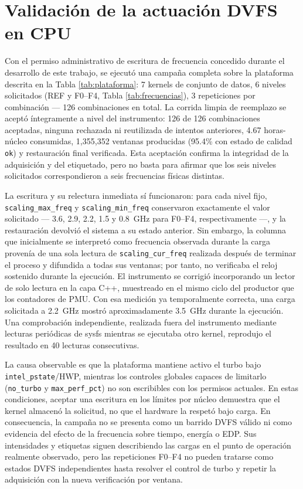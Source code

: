 \documentclass[12pt,oneside,spanish]{book}
\begin{document}
\section{Validación de la actuación DVFS en CPU}
\label{sec:resultados-cpu-dvfs}

Con el permiso administrativo de escritura de frecuencia concedido durante el desarrollo de este trabajo, se ejecutó una campaña completa sobre la plataforma descrita en la Tabla \ref{tab:plataforma}: 7 kernels de conjunto de datos, 6 niveles solicitados (REF y F0--F4, Tabla \ref{tab:frecuencias}), 3 repeticiones por combinación --- 126 combinaciones en total. La corrida limpia de reemplazo se aceptó íntegramente a nivel del instrumento: 126 de 126 combinaciones aceptadas, ninguna rechazada ni reutilizada de intentos anteriores, 4.67 horas-núcleo consumidas, 1,355,352 ventanas producidas (95.4\% con estado de calidad \texttt{ok}) y restauración final verificada. Esta aceptación confirma la integridad de la adquisición y del etiquetado, pero no basta para afirmar que los seis niveles solicitados correspondieron a seis frecuencias físicas distintas.

La escritura y su relectura inmediata sí funcionaron: para cada nivel fijo, \texttt{scaling\_max\_freq} y \texttt{scaling\_min\_freq} conservaron exactamente el valor solicitado --- 3.6, 2.9, 2.2, 1.5 y 0.8~GHz para F0--F4, respectivamente ---, y la restauración devolvió el sistema a su estado anterior. Sin embargo, la columna que inicialmente se interpretó como frecuencia observada durante la carga provenía de una sola lectura de \texttt{scaling\_cur\_freq} realizada después de terminar el proceso y difundida a todas sus ventanas; por tanto, no verificaba el reloj sostenido durante la ejecución. El instrumento se corrigió incorporando un lector de solo lectura en la capa C++, muestreado en el mismo ciclo del productor que los contadores de PMU. Con esa medición ya temporalmente correcta, una carga solicitada a 2.2~GHz mostró aproximadamente 3.5~GHz durante la ejecución. Una comprobación independiente, realizada fuera del instrumento mediante lecturas periódicas de sysfs mientras se ejecutaba otro kernel, reprodujo el resultado en 40 lecturas consecutivas.

La causa observable es que la plataforma mantiene activo el turbo bajo \texttt{intel\_pstate}/HWP, mientras los controles globales capaces de limitarlo (\texttt{no\_turbo} y \texttt{max\_perf\_pct}) no son escribibles con los permisos actuales. En estas condiciones, aceptar una escritura en los límites por núcleo demuestra que el kernel almacenó la solicitud, no que el hardware la respetó bajo carga. En consecuencia, la campaña no se presenta como un barrido DVFS válido ni como evidencia del efecto de la frecuencia sobre tiempo, energía o EDP. Sus intensidades y etiquetas siguen describiendo las cargas en el punto de operación realmente observado, pero las repeticiones F0--F4 no pueden tratarse como estados DVFS independientes hasta resolver el control de turbo y repetir la adquisición con la nueva verificación por ventana.
\end{document}
